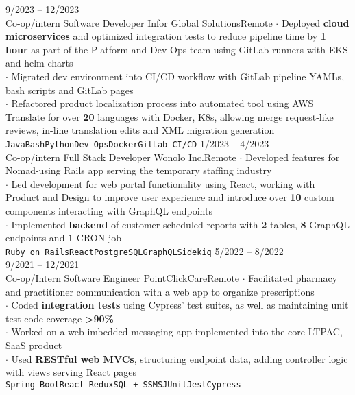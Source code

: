 \documentclass[8pt]{developercv} %
\begin{document}
\begin{minipage}[t]{\textwidth}
	\begin{entrylist}
		\entry
			{9/2023 -- 12/2023\\\footnotesize{Co-op/intern}}
			{Software Developer}
			{Infor Global Solutions\slashsep Remote}
			{
				$\cdot$ Deployed \textbf{cloud microservices} and optimized integration tests to reduce pipeline time by \textbf{1 hour} as part of the Platform and Dev Ops team using GitLab runners with EKS and helm charts\\
        $\cdot$ Migrated dev environment into CI/CD workflow with GitLab pipeline YAMLs, bash scripts and GitLab pages\\
				$\cdot$ Refactored product localization process into automated tool using AWS Translate for over \textbf{20} languages with Docker, K8s, allowing merge request-like reviews, in-line translation edits and XML migration generation\\
				\texttt{Java}\slashsep\texttt{Bash}\slashsep\texttt{Python}\slashsep\texttt{Dev Ops}\slashsep\texttt{Docker}\slashsep\texttt{GitLab CI/CD}
			}
		\entry
			{1/2023 -- 4/2023\\\footnotesize{Co-op/intern}}
			{Full Stack Developer}
			{Wonolo Inc.\slashsep Remote}
			{
				$\cdot$ Developed features for Nomad-using Rails app serving the temporary staffing industry\\
        $\cdot$ Led development for web portal functionality using React, working with Product and Design to improve user experience and introduce over \textbf{10} custom components interacting with GraphQL endpoints\\
				$\cdot$ Implemented \textbf{backend} of customer scheduled reports with \textbf{2} tables, \textbf{8} GraphQL endpoints and \textbf{1} CRON job\\
				\texttt{Ruby on Rails}\slashsep\texttt{React}\slashsep\texttt{PostgreSQL}\slashsep\texttt{GraphQL}\slashsep\texttt{Sidekiq}
			}
		\entry
			{5/2022 -- 8/2022\\9/2021 -- 12/2021\\\footnotesize{Co-op/Intern}}
			{Software Engineer}
			{PointClickCare\slashsep Remote}
			{
				$\cdot$ Facilitated pharmacy and practitioner communication with a web app to organize prescriptions\\
				$\cdot$ Coded \textbf{integration tests} using Cypress' test suites, as well as maintaining unit test code coverage \textbf{>90\%}\\
				$\cdot$ Worked on a web imbedded messaging app implemented into the core LTPAC, SaaS product\\
				$\cdot$ Used \textbf{RESTful web MVCs}, structuring endpoint data, adding controller logic with views serving React pages\\
				\texttt{Spring Boot}\slashsep\texttt{React Redux}\slashsep\texttt{SQL + SSMS}\slashsep\texttt{JUnit}\slashsep\texttt{Jest}\slashsep\texttt{Cypress}
			}
	\end{entrylist}
\end{minipage}
\end{document}
